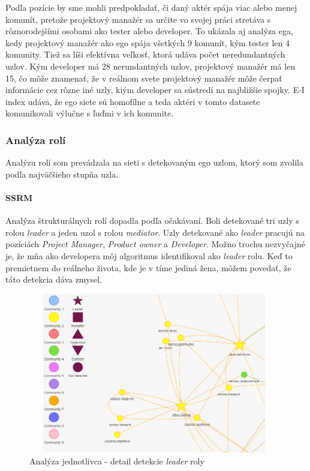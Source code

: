 \documentclass[slovak,master,public,dept460,male,cpdeclaration,oneside]{diploma}
\begin{document}
Podľa pozície by sme mohli predpokladať, či daný aktér spája viac alebo menej komunít, pretože projektový manažér sa určite vo svojej práci stretáva s rôznorodejšími osobami ako tester alebo developer. To ukázala aj analýza ega, kedy projektový manažér ako ego spája všetkých 9 komunít, kým tester len 4 komunity. Tiež sa líši efektívna veľkosť, ktorá udáva počet neredundantných uzlov. Kým developer má 28 nerundantných uzlov, projektový manažér má len 15, čo môže znamenať, že v reálnom svete projektový manažér môže čerpať informácie cez rôzne iné uzly, kiým developer sa sústredí na najbližšie spojky. E-I index udáva, že ego siete sú homofílne a teda aktéri v tomto datasete komunikovali výlučne s ľuďmi v ich komunite.

\subsubsection{Analýza rolí}
Analýzu rolí som prevádzala na sieti s detekovaným ego uzlom, ktorý som zvolila podľa najväčšieho stupňa uzla.

\paragraph{SSRM}
\hfill \break
Analýza štrukturálnych rolí dopadla podľa očakávaní. Boli detekované tri uzly s rolou \textit{leader} a jeden uzol s rolou \textit{mediator}. Uzly detekované ako \textit{leader} pracujú na pozíciách \textit{Project Manager}, \textit{Product owner} a \textit{Developer}. Možno trochu nezvyčajné je, že mňa ako developera môj algoritmus identifikoval ako  \textit{leader} rolu. Keď  to premietnem do reálneho života, kde je v tíme jediná žena, môžem povedať, že táto detekcia dáva zmysel.


\begin{figure}[H]
\centering
\includegraphics[width=11cm, height=7cm]{figures/analyza_jednotlivca_ssrm_detail}
\caption{Analýza jednotlivca - detail detekcie \textit{leader} roly}
\end{figure}
\end{document}
